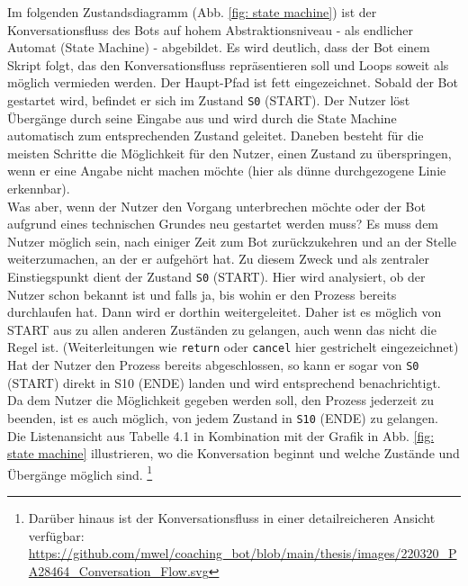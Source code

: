 	Im folgenden Zustandsdiagramm (Abb. \ref*{fig: state machine}) ist der Konversationsfluss des Bots auf hohem Abstraktionsniveau - als endlicher Automat (State Machine) - abgebildet. Es wird deutlich, dass der Bot einem Skript folgt, das den Konversationsfluss repräsentieren soll und Loops soweit als möglich vermieden werden. Der Haupt-Pfad ist fett eingezeichnet. Sobald der Bot gestartet wird, befindet er sich im Zustand \verb|S0| (START). Der Nutzer löst Übergänge durch seine Eingabe aus und wird durch die State Machine automatisch zum entsprechenden Zustand geleitet. Daneben besteht für die meisten Schritte die Möglichkeit für den Nutzer, einen Zustand zu überspringen, wenn er eine Angabe nicht machen möchte (hier als dünne durchgezogene Linie erkennbar). \\
	Was aber, wenn der Nutzer den Vorgang unterbrechen möchte oder der Bot aufgrund eines technischen Grundes neu gestartet werden muss? Es muss dem Nutzer möglich sein, nach einiger Zeit zum Bot zurückzukehren und an der Stelle weiterzumachen, an der er aufgehört hat. Zu diesem Zweck und als zentraler Einstiegspunkt dient der Zustand \verb|S0| (START). Hier wird analysiert, ob der Nutzer schon bekannt ist und falls ja, bis wohin er den Prozess bereits durchlaufen hat. Dann wird er dorthin weitergeleitet. Daher ist es möglich von START aus zu allen anderen Zuständen zu gelangen, auch wenn das nicht die Regel ist. (Weiterleitungen wie \verb|return| oder \verb|cancel| hier gestrichelt eingezeichnet) Hat der Nutzer den Prozess bereits abgeschlossen, so kann er sogar von \verb|S0| (START) direkt in S10 (ENDE) landen und wird entsprechend benachrichtigt. Da dem Nutzer die Möglichkeit gegeben werden soll, den Prozess jederzeit zu beenden, ist es auch möglich, von jedem Zustand in \verb|S10| (ENDE) zu gelangen. Die Listenansicht aus Tabelle 4.1 in Kombination mit der Grafik in Abb. \ref*{fig: state machine} illustrieren, wo die Konversation beginnt und welche Zustände und Übergänge möglich sind. \footnote{Darüber hinaus ist der Konversationsfluss in einer detailreicheren Ansicht verfügbar: \url{https://github.com/mwel/coaching_bot/blob/main/thesis/images/220320_PA28464_Conversation_Flow.svg}}
	
